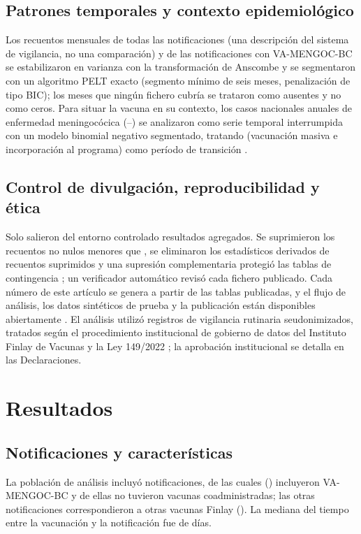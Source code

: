\documentclass[11pt]{article}
\begin{document}
\subsection{Patrones temporales y contexto epidemiológico}\label{sec:m-time}
Los recuentos mensuales de todas las notificaciones (una descripción del sistema de vigilancia,
no una comparación) y de las notificaciones con VA-MENGOC-BC se estabilizaron en varianza con la transformación de
Anscombe \cite{Anscombe1948} y se segmentaron con un algoritmo PELT exacto
\cite{Killick2012,Truong2020} (segmento mínimo de seis meses, penalización de tipo BIC); los meses que ningún fichero cubría se
trataron como ausentes y no como ceros. Para situar
la vacuna en su contexto, los casos nacionales anuales de enfermedad meningocócica
(\POITSFirstYear--\POITSLastYear) se analizaron como serie temporal interrumpida con un modelo
binomial negativo segmentado, tratando \POITSTransition{} (vacunación masiva e incorporación al
programa) como período de transición \cite{Bernal2017}.

\subsection{Control de divulgación, reproducibilidad y ética}\label{sec:m-sdc}
Solo salieron del entorno controlado resultados agregados. Se suprimieron los recuentos no nulos
menores que \VMinCell, se eliminaron los estadísticos derivados de recuentos suprimidos y una
supresión complementaria protegió las tablas de contingencia \cite{Hundepool2012}; un verificador
automático revisó cada fichero publicado. Cada número de este artículo se genera a partir de las
tablas publicadas, y el flujo de análisis, los datos sintéticos de prueba y la publicación están
disponibles abiertamente \cite{Wilkinson2016}. El análisis utilizó registros de vigilancia rutinaria
seudonimizados, tratados según el procedimiento institucional de gobierno de datos del Instituto
Finlay de Vacunas y la Ley 149/2022 \cite{Ley149}; la aprobación institucional se detalla en las
Declaraciones.

\section{Resultados}\label{sec:results}

\subsection{Notificaciones y características}\label{sec:r-reports}
La población de análisis incluyó \PONReports{} notificaciones, de las cuales \PONTarget{}
(\POPctTarget) incluyeron VA-MENGOC-BC y \PONTargetOnly{} de ellas no tuvieron vacunas
coadministradas; las otras \PONOther{} notificaciones correspondieron a otras vacunas Finlay
(). La mediana del tiempo entre la vacunación y la notificación fue de
\PODelayMedian{} días.
\end{document}
